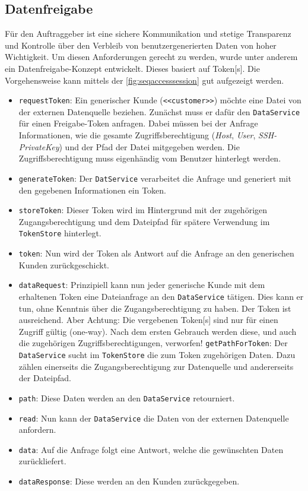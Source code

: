 \subsection{Datenfreigabe}
Für den Auftraggeber ist eine sichere Kommunikation und stetige Transparenz und Kontrolle über den Verbleib von benutzergenerierten Daten von hoher Wichtigkeit. Um diesen Anforderungen gerecht zu werden, wurde unter anderem ein Datenfreigabe-Konzept entwickelt. Dieses basiert auf \gls{Token}[s]. Die Vorgehensweise kann mittels der \autoref{fig:seqaccesssession} gut aufgezeigt werden.

\begin{itemize}
    \item \texttt{requestToken}: Ein generischer Kunde (\texttt{<<customer>>}) möchte eine Datei von der externen Datenquelle beziehen. Zunächst muss er dafür den \texttt{Da\-ta\-Ser\-vi\-ce} für einen Freigabe-\gls{Token} anfragen. Dabei müssen bei der Anfrage Informationen, wie die gesamte Zugriffsberechtigung (\textit{Host}, \textit{User}, \textit{SSH-PrivateKey}) und der Pfad der Datei mitgegeben werden. Die Zugriffsberechtigung muss eigenhändig vom Benutzer hinterlegt werden.
    
    \item \texttt{generateToken}: Der \texttt{DatService} verarbeitet die Anfrage und generiert mit den gegebenen Informationen ein \gls{Token}.
    
    \item \texttt{storeToken}: Dieser \gls{Token} wird im Hintergrund mit der zu\-ge\-höri\-gen Zugangsberechtigung und dem Dateipfad für spätere Verwendung im \texttt{TokenStore} hinterlegt.
    
    \item \texttt{token}: Nun wird der \gls{Token} als Antwort auf die Anfrage an den generischen Kunden zurückgeschickt.
    
    \item \texttt{dataRequest}: Prinzipiell kann nun jeder generische Kunde mit dem erhaltenen \gls{Token} eine Dateianfrage an den \texttt{DataService} tätigen. Dies kann er tun, ohne Kenntnis über die Zugangsberechtigung zu haben. Der \gls{Token} ist ausreichend. Aber Achtung: Die vergebenen \gls{Token}[s] sind nur für einen Zugriff gültig (one-way). Nach dem ersten Gebrauch werden diese, und auch die zugehörigen Zugriffsberechtigungen, verworfen!
    \texttt{getPathForToken}: Der \texttt{DataService} sucht im \texttt{TokenStore} die zum \gls{Token} zu\-ge\-hör\-igen Daten. Dazu zählen einerseits die Zugangsberechtigung zur Datenquelle und andererseits der Dateipfad.
    
    \item \texttt{path}: Diese Daten werden an den \texttt{DataService} retourniert.
    \item \texttt{read}: Nun kann der \texttt{DataService} die Daten von der externen Datenquelle anfordern.
    \item \texttt{data}: Auf die Anfrage folgt eine Antwort, welche die ge\-wünsch\-ten Daten zurückliefert.
    \item \texttt{dataResponse}: Diese werden an den Kunden zurückgegeben.

\end{itemize}



